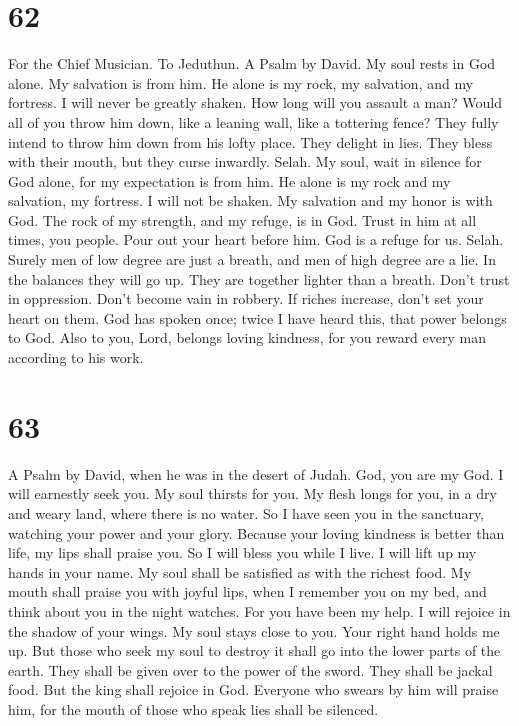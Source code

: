 \hypertarget{section-60}{%
\section{62}\label{section-60}}

For the Chief Musician. To Jeduthun. A Psalm by David.  My
soul rests in God alone. My salvation is from him.  He alone
is my rock, my salvation, and my fortress. I will never be greatly
shaken.  How long will you assault a man? Would all of you
throw him down, like a leaning wall, like a tottering fence?
 They fully intend to throw him down from his lofty place.
They delight in lies. They bless with their mouth, but they curse
inwardly. Selah.  My soul, wait in silence for God alone,
for my expectation is from him.  He alone is my rock and my
salvation, my fortress. I will not be shaken.  My salvation
and my honor is with God. The rock of my strength, and my refuge, is in
God.  Trust in him at all times, you people. Pour out your
heart before him. God is a refuge for us. Selah.  Surely men
of low degree are just a breath, and men of high degree are a lie. In
the balances they will go up. They are together lighter than a breath.
 Don't trust in oppression. Don't become vain in robbery.
If riches increase, don't set your heart on them.  God has
spoken once; twice I have heard this, that power belongs to God.
 Also to you, Lord, belongs loving kindness, for you reward
every man according to his work.

\hypertarget{section-61}{%
\section{63}\label{section-61}}

A Psalm by David, when he was in the desert of Judah.  God,
you are my God. I will earnestly seek you. My soul thirsts for you. My
flesh longs for you, in a dry and weary land, where there is no water.
 So I have seen you in the sanctuary, watching your power
and your glory.  Because your loving kindness is better than
life, my lips shall praise you.  So I will bless you while I
live. I will lift up my hands in your name.  My soul shall
be satisfied as with the richest food. My mouth shall praise you with
joyful lips,  when I remember you on my bed, and think about
you in the night watches.  For you have been my help. I will
rejoice in the shadow of your wings.  My soul stays close to
you. Your right hand holds me up.  But those who seek my
soul to destroy it shall go into the lower parts of the earth.
 They shall be given over to the power of the sword. They
shall be jackal food.  But the king shall rejoice in God.
Everyone who swears by him will praise him, for the mouth of those who
speak lies shall be silenced.

